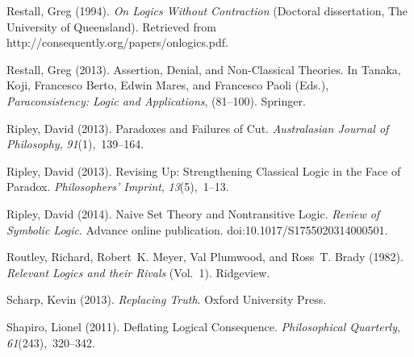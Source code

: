 \documentclass{ergoclass}
\begin{document}
\begin{thebibliography}{54}
Restall, Greg (1994).
\newblock \emph{On Logics Without Contraction} (Doctoral dissertation, The University of Queensland).
\newblock Retrieved from http://consequently.org/papers/onlogics.pdf.


Restall, Greg (2013).
\newblock Assertion, Denial, and Non-Classical Theories.
\newblock In Tanaka, Koji, Francesco Berto, Edwin Mares, and Francesco Paoli
  (Eds.), \emph{Paraconsistency: Logic and Applications}, (81--100). Springer.

Ripley, David (2013{}).
\newblock Paradoxes and Failures of Cut.
\newblock \emph{Australasian Journal of Philosophy}, \emph{91}(1),~139--164.

Ripley, David (2013{}).
\newblock Revising Up: {S}trengthening Classical Logic in the Face of Paradox.
\newblock \emph{Philosophers' Imprint}, \emph{13}(5),~1--13.

Ripley, David (2014).
\newblock Naive Set Theory and Nontransitive Logic.
\newblock \emph{Review of Symbolic Logic}.
\newblock Advance online publication. 
\newblock doi:10.1017/S1755020314000501.

Routley, Richard, Robert~K. Meyer, Val Plumwood, and Ross~T. Brady (1982).
\newblock \emph{Relevant Logics and their Rivals} (Vol.~1).
\newblock Ridgeview.

Scharp, Kevin (2013).
\newblock \emph{Replacing Truth}.
\newblock Oxford University Press.

Shapiro, Lionel (2011).
\newblock Deflating Logical Consequence.
\newblock \emph{Philosophical Quarterly}, \emph{61}(243),~320--342.


\end{thebibliography}
\end{document}
